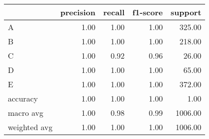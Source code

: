 \begin{tabular}{|l|r|r|r|r|}
\hline
{} &  precision &  recall &  f1-score &  support \\
\hline
A            &       1.00 &    1.00 &      1.00 &   325.00 \\
B            &       1.00 &    1.00 &      1.00 &   218.00 \\
C            &       1.00 &    0.92 &      0.96 &    26.00 \\
D            &       1.00 &    1.00 &      1.00 &    65.00 \\
E            &       1.00 &    1.00 &      1.00 &   372.00 \\
accuracy     &       1.00 &    1.00 &      1.00 &     1.00 \\
macro avg    &       1.00 &    0.98 &      0.99 &  1006.00 \\
weighted avg &       1.00 &    1.00 &      1.00 &  1006.00 \\
\hline
\end{tabular}
